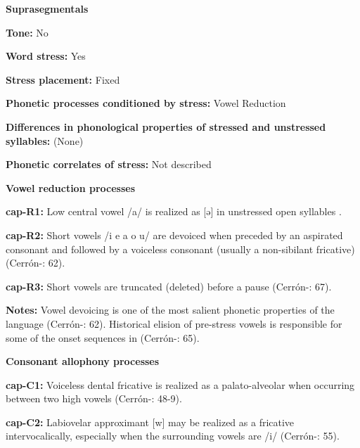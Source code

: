 \textbf{Suprasegmentals}



\textbf{Tone:} No



\textbf{Word stress:} Yes



\textbf{Stress placement:} Fixed



\textbf{Phonetic processes conditioned by stress:} Vowel Reduction



\textbf{Differences in phonological properties of stressed and unstressed syllables:} (None)



\textbf{Phonetic correlates of stress:} Not described



\textbf{Vowel reduction processes}



\textbf{cap-R1:} Low central vowel /a/ is realized as [ə] in unstressed open syllables \citep[301]{Olson1967}.



\textbf{cap-R2:} Short vowels /i e a o u/ are devoiced when preceded by an aspirated consonant and followed by a voiceless consonant (usually a non-sibilant fricative) (Cerrón-\citealt{Palomino2006}: 62).



\textbf{cap-R3:} Short vowels are truncated (deleted) before a pause (Cerrón-\citealt{Palomino2006}: 67).



\textbf{Notes:} Vowel devoicing is one of the most salient phonetic properties of the language (Cerrón-\citealt{Palomino2006}: 62). Historical elision of pre-stress vowels is responsible for some of the onset sequences in  (Cerrón-\citealt{Palomino2006}: 65).



\textbf{Consonant allophony processes}



\textbf{cap-C1:} Voiceless dental fricative is realized as a palato-alveolar when occurring between two high vowels (Cerrón-\citealt{Palomino2006}: 48-9).



\textbf{cap-C2:} Labiovelar approximant [w] may be realized as a fricative intervocalically, especially when the surrounding vowels are /i/ (Cerrón-\citealt{Palomino2006}: 55).



